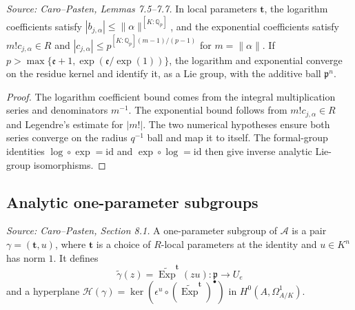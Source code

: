 \begin{lemma}
  \label{lem:cp_logexp_convergence_linearization}
  \textit{Source: Caro--Pasten, Lemmas 7.5--7.7.}
  In local parameters \(\mathbf t\), the logarithm coefficients satisfy
  \(|b_{j,\alpha}|\le\|\alpha\|^{[K:\mathbb Q_p]}\), and the exponential
  coefficients satisfy
  \(m!c_{j,\alpha}\in R\) and
  \(|c_{j,\alpha}|\le p^{[K:\mathbb Q_p](m-1)/(p-1)}\) for
  \(m=\|\alpha\|\).  If
  \(p>\max\{\mathfrak e+1,\exp(\mathfrak e/\exp(1))\}\), the logarithm and
  exponential converge on the residue kernel and identify it, as a Lie group,
  with the additive ball \(\mathfrak p^n\).
\end{lemma}
\begin{proof}
  The logarithm coefficient bound comes from the integral multiplication
  series and denominators \(m^{-1}\).  The exponential bound follows from
  \(m!c_{j,\alpha}\in R\) and Legendre's estimate for \(|m!|\).  The two
  numerical hypotheses ensure both series converge on the radius \(q^{-1}\)
  ball and map it to itself.  The formal-group identities
  \(\log\circ\exp=\mathrm{id}\) and \(\exp\circ\log=\mathrm{id}\) then give
  inverse analytic Lie-group isomorphisms.
\end{proof}

\subsection{Analytic one-parameter subgroups}

\begin{definition}
  \label{def:cp_one_parameter_subgroup}
  \textit{Source: Caro--Pasten, Section 8.1.}
  A one-parameter subgroup of \(\mathcal A\) is a pair
  \(\gamma=(\mathbf t,u)\), where \(\mathbf t\) is a choice of \(R\)-local
  parameters at the identity and \(u\in K^n\) has norm \(1\).  It defines
  \[
    \widetilde\gamma(z)=\widetilde{\operatorname{Exp}}^{\mathbf t}(zu)
      :\mathfrak p\to U_e
  \]
  and a hyperplane
  \(\mathcal H(\gamma)=\ker(\epsilon^u\circ
  (\widetilde{\operatorname{Exp}}^{\mathbf t})^\bullet)\) in
  \(H^0(A,\Omega^1_{A/K})\).
\end{definition}

